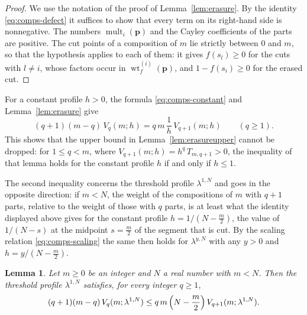 \documentclass{amsart}
\newtheorem{lemma}[theorem]{Lemma}
\theoremstyle{definition}
\theoremstyle{remark}
\numberwithin{equation}{section}
\begin{document}
\begin{proof}
We use the notation of the proof of Lemma~\ref{lem:erasure}. By the identity \eqref{eq:comps-defect} it suffices to show that every term on its right-hand side is nonnegative. The numbers $\operatorname{mult}_i(\mathbf p)$ and the Cayley coefficients of the parts are positive. The cut points of a composition of $m$ lie strictly between $0$ and $m$, so that the hypothesis applies to each of them: it gives $f(s_l)\ge 0$ for the cuts with $l\ne i$, whose factors occur in $\operatorname{wt}_f^{(i)}(\mathbf p)$, and $1-f(s_i)\ge 0$ for the erased cut.
\end{proof}

For a constant profile $h>0$, the formula \eqref{eq:comps-constant} and Lemma~\ref{lem:erasure} give
\[
(q+1)(m-q)\,V_q(m;h)=q\,m\,\frac{1}{h}\,V_{q+1}(m;h)\qquad(q\ge 1).
\]
This shows that the upper bound in Lemma~\ref{lem:erasureupper} cannot be dropped: for $1\le q<m$, where $V_{q+1}(m;h)=h^{q}\,T_{m,q+1}>0$, the inequality of that lemma holds for the constant profile $h$ if and only if $h\le 1$.

The second inequality concerns the threshold profile $\lambda^{1,N}$ and goes in the opposite direction: if $m<N$, the weight of the compositions of $m$ with $q+1$ parts, relative to the weight of those with $q$ parts, is at least what the identity displayed above gives for the constant profile $h=1/(N-\frac m2)$, the value of $1/(N-s)$ at the midpoint $s=\frac m2$ of the segment that is cut. By the scaling relation \eqref{eq:comps-scaling} the same then holds for $\lambda^{y,N}$ with any $y>0$ and $h=y/(N-\frac m2)$.

\begin{lemma}\label{lem:midpoint}
Let $m\ge 0$ be an integer and $N$ a real number with $m<N$. Then the threshold profile $\lambda^{1,N}$ satisfies, for every integer $q\ge 1$,
\[
(q+1)(m-q)\,V_q(m;\lambda^{1,N})\le q\,m\,\Bigl(N-\frac{m}{2}\Bigr)\,V_{q+1}(m;\lambda^{1,N}).
\]
\end{lemma}
\end{document}
